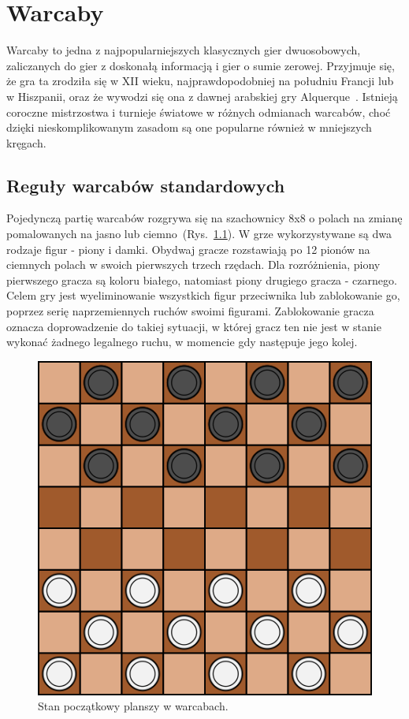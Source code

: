 \chapter{Warcaby}
\thispagestyle{chapterBeginStyle}
\label{rozdzial1}

Warcaby to jedna z najpopularniejszych klasycznych gier dwuosobowych, zaliczanych do gier z doskonałą informacją i gier o sumie zerowej. Przyjmuje się, że gra ta zrodziła się w XII wieku, najprawdopodobniej na południu Francji lub w Hiszpanii, oraz że wywodzi się ona z dawnej arabskiej gry Alquerque~\cite{Gry}. Istnieją coroczne mistrzostwa i turnieje  światowe w różnych odmianach warcabów, choć dzięki nieskomplikowanym zasadom są one popularne również w mniejszych kręgach.

\section{Reguły warcabów standardowych}

Pojedynczą partię warcabów rozgrywa się na szachownicy 8x8 o polach na zmianę pomalowanych na jasno lub ciemno~(Rys.~\ref{fig:plansza}). W grze wykorzystywane są dwa rodzaje figur - piony i damki. Obydwaj gracze rozstawiają po 12 pionów na ciemnych polach w swoich pierwszych trzech rzędach. Dla rozróżnienia, piony pierwszego gracza są koloru białego, natomiast piony drugiego gracza - czarnego. Celem gry jest wyeliminowanie wszystkich figur przeciwnika lub zablokowanie go, poprzez serię naprzemiennych ruchów swoimi figurami. Zablokowanie gracza oznacza doprowadzenie do takiej sytuacji, w której gracz ten nie jest w stanie wykonać żadnego legalnego ruchu, w momencie gdy następuje jego kolej.

\FloatBarrier

\begin{figure}[h!]
\centering
\includegraphics[scale=.6]{graphics/warcaby_planszaStartowa.png}
\caption{Stan początkowy planszy w warcabach.}
\label{fig:plansza}
\end{figure}

